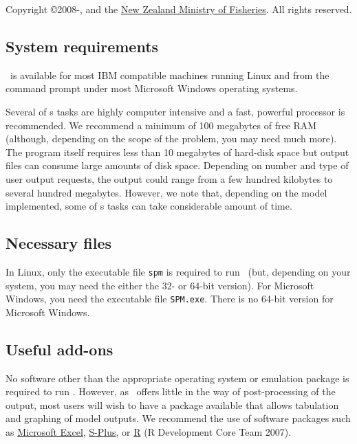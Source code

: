 Copyright \copyright 2008-\SourceControlYear, \href{http://www.niwa.co.nz}{\Organisation} and the \href{http://www.fish.govt.nz}{New Zealand Ministry of Fisheries}. All rights reserved. 

\subsection{System requirements}

\SPM\ is available for most IBM compatible machines running Linux and from the command prompt under most Microsoft Windows operating systems. 

Several of \SPM s tasks are highly computer intensive and a fast, powerful processor is recommended. We recommend a minimum of 100 megabytes of free RAM (although, depending on the scope of the problem, you may need much more). The program itself requires less than 10 megabytes of hard-disk space but output files can consume large amounts of disk space. Depending on number and type of user output requests, the output could range from a few hundred kilobytes to several hundred megabytes. However, we note that, depending on the model implemented, some of \SPM s tasks can take considerable amount of time.

\subsection{Necessary files}

In Linux, only the executable file \texttt{spm} is required to run \SPM\ (but, depending on your system, you may need the either the 32- or 64-bit version). For Microsoft Windows, you need the executable file \texttt{SPM.exe}. There is no 64-bit version for Microsoft Windows.

\subsection{Useful add-ons}

No software other than the appropriate operating system or emulation package is required to run \SPM. However, as \SPM\ offers little in the way of  post-processing of the output, most users will wish to have a package available that allows tabulation and graphing of model outputs. We recommend the use of software packages such as \href{http://www.microsoft.com}{Microsoft Excel}, \href{http://www.insightful.com}{S-Plus}, or \href{http://www.r-project.org}{R} (R Development Core Team 2007). 

